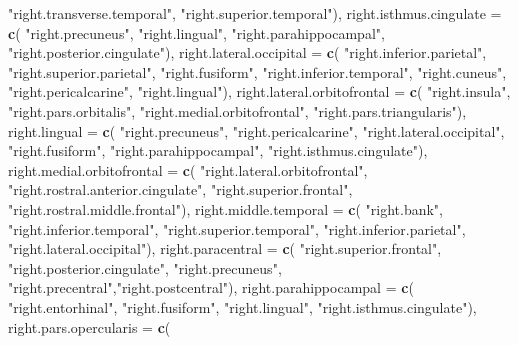 \documentclass[
]{article}
\newenvironment{Shaded}{\begin{snugshade}}{\end{snugshade}}
\newcommand{\DataTypeTok}[1]{\textcolor[rgb]{0.13,0.29,0.53}{#1}}
\newcommand{\KeywordTok}[1]{\textcolor[rgb]{0.13,0.29,0.53}{\textbf{#1}}}
\newcommand{\NormalTok}[1]{#1}
\newcommand{\StringTok}[1]{\textcolor[rgb]{0.31,0.60,0.02}{#1}}
\begin{document}
\begin{Shaded}
\begin{Highlighting}[]
   \StringTok{"right.transverse.temporal"}\NormalTok{, }\StringTok{"right.superior.temporal"}\NormalTok{),}
 \DataTypeTok{right.isthmus.cingulate =} \KeywordTok{c}\NormalTok{(}
   \StringTok{"right.precuneus"}\NormalTok{, }\StringTok{"right.lingual"}\NormalTok{, }\StringTok{"right.parahippocampal"}\NormalTok{,}
   \StringTok{"right.posterior.cingulate"}\NormalTok{),}
 \DataTypeTok{right.lateral.occipital =} \KeywordTok{c}\NormalTok{(}
   \StringTok{"right.inferior.parietal"}\NormalTok{, }\StringTok{"right.superior.parietal"}\NormalTok{, }\StringTok{"right.fusiform"}\NormalTok{,}
   \StringTok{"right.inferior.temporal"}\NormalTok{, }\StringTok{"right.cuneus"}\NormalTok{, }\StringTok{"right.pericalcarine"}\NormalTok{,}
   \StringTok{"right.lingual"}\NormalTok{),}
 \DataTypeTok{right.lateral.orbitofrontal =} \KeywordTok{c}\NormalTok{(}
   \StringTok{"right.insula"}\NormalTok{, }\StringTok{"right.pars.orbitalis"}\NormalTok{,}
   \StringTok{"right.medial.orbitofrontal"}\NormalTok{, }\StringTok{"right.pars.triangularis"}\NormalTok{),}
 \DataTypeTok{right.lingual =} \KeywordTok{c}\NormalTok{(}
   \StringTok{"right.precuneus"}\NormalTok{, }\StringTok{"right.pericalcarine"}\NormalTok{, }\StringTok{"right.lateral.occipital"}\NormalTok{,}
   \StringTok{"right.fusiform"}\NormalTok{, }\StringTok{"right.parahippocampal"}\NormalTok{, }\StringTok{"right.isthmus.cingulate"}\NormalTok{),}
 \DataTypeTok{right.medial.orbitofrontal =} \KeywordTok{c}\NormalTok{(}
   \StringTok{"right.lateral.orbitofrontal"}\NormalTok{, }\StringTok{"right.rostral.anterior.cingulate"}\NormalTok{,}
   \StringTok{"right.superior.frontal"}\NormalTok{, }\StringTok{"right.rostral.middle.frontal"}\NormalTok{),}
 \DataTypeTok{right.middle.temporal =} \KeywordTok{c}\NormalTok{(}
   \StringTok{"right.bank"}\NormalTok{, }\StringTok{"right.inferior.temporal"}\NormalTok{, }\StringTok{"right.superior.temporal"}\NormalTok{,}
   \StringTok{"right.inferior.parietal"}\NormalTok{, }\StringTok{"right.lateral.occipital"}\NormalTok{),}
 \DataTypeTok{right.paracentral =} \KeywordTok{c}\NormalTok{(}
   \StringTok{"right.superior.frontal"}\NormalTok{, }\StringTok{"right.posterior.cingulate"}\NormalTok{, }\StringTok{"right.precuneus"}\NormalTok{,}
   \StringTok{"right.precentral"}\NormalTok{,}\StringTok{"right.postcentral"}\NormalTok{),}
 \DataTypeTok{right.parahippocampal =} \KeywordTok{c}\NormalTok{(}
   \StringTok{"right.entorhinal"}\NormalTok{, }\StringTok{"right.fusiform"}\NormalTok{, }\StringTok{"right.lingual"}\NormalTok{,}
   \StringTok{"right.isthmus.cingulate"}\NormalTok{),}
 \DataTypeTok{right.pars.opercularis =} \KeywordTok{c}\NormalTok{(}

\end{Highlighting}
\end{Shaded}
\end{document}
